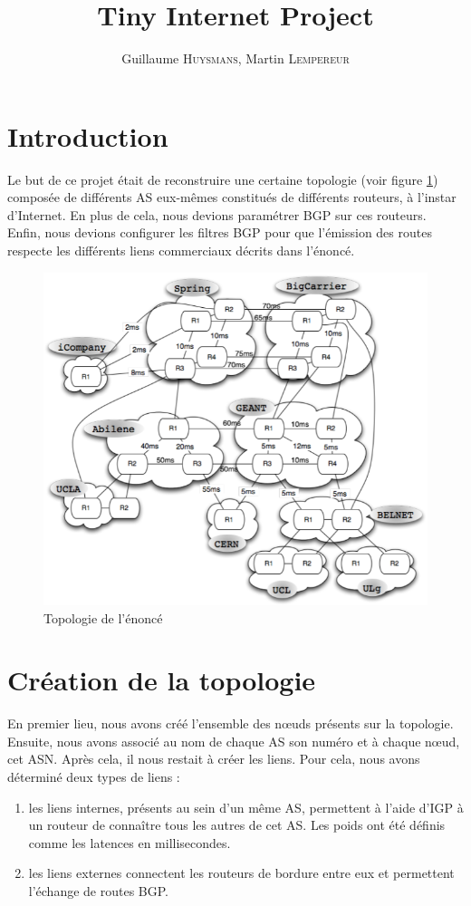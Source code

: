 \documentclass[10pt,a4paper,twocolumn]{article}
\title{Tiny Internet Project}
\author{Guillaume \textsc{Huysmans}, Martin \textsc{Lempereur}}
\begin{document}
\maketitle

\section{Introduction}
Le but de ce projet était de reconstruire une certaine topologie (voir figure \ref{fig:topo}) composée de différents AS eux-mêmes constitués de différents routeurs, à l'instar d'Internet. En plus de cela, nous devions paramétrer BGP sur ces routeurs. Enfin, nous devions configurer les filtres BGP pour que l'émission des routes respecte les différents liens commerciaux décrits dans l'énoncé.
\begin{figure}[h]
	\includegraphics[width=\columnwidth]{topo.png}
	\caption{Topologie de l'énoncé}
	\label{fig:topo}
\end{figure}

\section{Création de la topologie}
En premier lieu, nous avons créé l'ensemble des nœuds présents sur la topologie. Ensuite, nous avons associé au nom de chaque AS son numéro et à chaque nœud, cet ASN.
Après cela, il nous restait à créer les liens. Pour cela, nous avons déterminé deux types de liens :
\begin{enumerate}
	\item les liens internes, présents au sein d'un même AS, permettent à l'aide d'IGP à un routeur de connaître tous les autres de cet AS. Les poids ont été définis comme les latences en millisecondes.
	\item les liens externes connectent les routeurs de bordure entre eux et permettent l'échange de routes BGP.
\end{enumerate}
\end{document}
